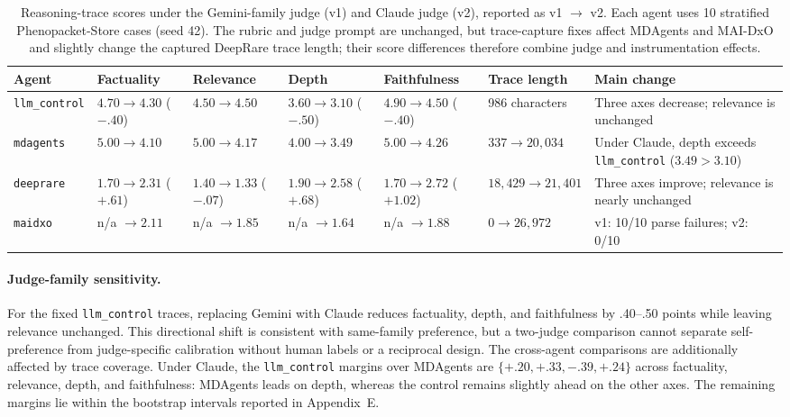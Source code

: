 \documentclass[letterpaper]{article} %
\begin{document}
\begin{table}[t]
\centering
\scriptsize
\setlength{\tabcolsep}{3.5pt}
\caption{Reasoning-trace scores under the Gemini-family judge (v1) and Claude judge (v2), reported as v1 $\rightarrow$ v2. Each agent uses 10 stratified Phenopacket-Store cases (seed 42). The rubric and judge prompt are unchanged, but trace-capture fixes affect MDAgents and MAI-DxO and slightly change the captured DeepRare trace length; their score differences therefore combine judge and instrumentation effects.}
\label{tbl:selfpref}
\begin{tabular}{@{}p{}p{}p{}p{}p{}p{}p{}@{}}
\toprule
Agent & Factuality & Relevance & Depth & Faithfulness & Trace length & Main change \\
\midrule
\texttt{llm\_control}
& $4.70 \rightarrow 4.30$ ($-.40$)
& $4.50 \rightarrow 4.50$
& $3.60 \rightarrow 3.10$ ($-.50$)
& $4.90 \rightarrow 4.50$ ($-.40$)
& 986 characters
& Three axes decrease; relevance is unchanged \\

\texttt{mdagents}
& $5.00 \rightarrow 4.10$
& $5.00 \rightarrow 4.17$
& $4.00 \rightarrow 3.49$
& $5.00 \rightarrow 4.26$
& $337 \rightarrow 20{,}034$
& Under Claude, depth exceeds \texttt{llm\_control} ($3.49>3.10$) \\

\texttt{deeprare}
& $1.70 \rightarrow 2.31$ ($+.61$)
& $1.40 \rightarrow 1.33$ ($-.07$)
& $1.90 \rightarrow 2.58$ ($+.68$)
& $1.70 \rightarrow 2.72$ ($+1.02$)
& $18{,}429 \rightarrow 21{,}401$
& Three axes improve; relevance is nearly unchanged \\

\texttt{maidxo}
& n/a $\rightarrow 2.11$
& n/a $\rightarrow 1.85$
& n/a $\rightarrow 1.64$
& n/a $\rightarrow 1.88$
& $0 \rightarrow 26{,}972$
& v1: 10/10 parse failures; v2: 0/10 \\
\bottomrule
\end{tabular}
\end{table}


\paragraph{Judge-family sensitivity.}
For the fixed \texttt{llm\_control} traces, replacing Gemini with Claude reduces factuality, depth, and faithfulness by .40--.50 points while leaving relevance unchanged. This directional shift is consistent with same-family preference, but a two-judge comparison cannot separate self-preference from judge-specific calibration without human labels or a reciprocal design. The cross-agent comparisons are additionally affected by trace coverage. Under Claude, the \texttt{llm\_control} margins over MDAgents are $\{+.20,+.33,-.39,+.24\}$ across factuality, relevance, depth, and faithfulness: MDAgents leads on depth, whereas the control remains slightly ahead on the other axes. The remaining margins lie within the bootstrap intervals reported in Appendix~E.
\end{document}

